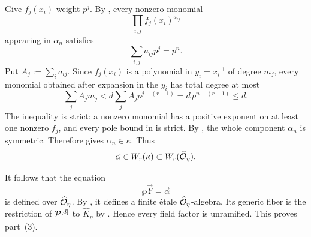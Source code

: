 Give $f_j(x_i)$ weight $p^j$. By
, every nonzero monomial
\[
    \prod_{i,j}f_j(x_i)^{a_{ij}}
\]
appearing in $\alpha_n$ satisfies
\[
    \sum_{i,j}a_{ij}p^j=p^n.
\]
Put $A_j:=\sum_i a_{ij}$. Since $f_j(x_i)$ is a polynomial in
$y_i=x_i^{-1}$ of degree $m_j$, every monomial obtained after expansion in
the $y_i$ has total degree at most
\[
    \sum_jA_jm_j
       <d\sum_jA_jp^{j-(r-1)}
       =d\,p^{n-(r-1)}
       \leq d.
\]
The inequality is strict: a nonzero monomial has a positive exponent on at
least one nonzero $f_j$, and every pole bound in
 is strict. By
, the whole component $\alpha_n$ is
symmetric. Therefore  gives
$\alpha_n\in\kappa$.
Thus
\[
    \vec\alpha\in W_r(\kappa)\subset W_r(\widehat{\mathcal{O}}_\eta).
\]

It follows that the equation
\[
    \wp\vec Y=\vec\alpha
\]
is defined over $\widehat{\mathcal{O}}_\eta$. By
, it defines a finite \'etale
$\widehat{\mathcal{O}}_\eta$-algebra. Its generic fiber is the restriction of
$\mathcal{P}^{[d]}$ to $\widehat K_\eta$ by
. Hence every field factor is
unramified. This proves part~(3).
